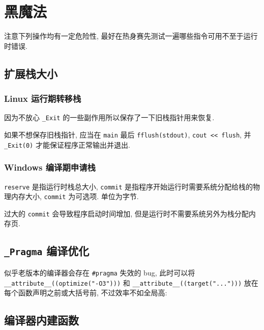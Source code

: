 \section{黑魔法}
注意下列操作均有一定危险性, 最好在热身赛先测试一遍哪些指令可用不至于运行时错误.

\subsection{扩展栈大小}
\subsubsection{Linux 运行期转移栈}


因为不放心 \lstinline{_Exit} 的一些副作用所以保存了一下旧栈指针用来恢复.

如果不想保存旧栈指针, 应当在 \lstinline{main} 最后 \lstinline{fflush(stdout)}, \lstinline{cout << flush}, 并 \lstinline{_Exit(0)} 才能保证程序正常输出并退出.

\subsubsection{Windows 编译期申请栈}


\lstinline{reserve} 是指运行时栈总大小, \lstinline{commit} 是指程序开始运行时需要系统分配给栈的物理内存大小, \lstinline{commit} 为可选项. 单位为字节.

过大的 \lstinline{commit} 会导致程序启动时间增加, 但是运行时不需要系统另外为栈分配内存页.

\subsection{\lstinline[basicstyle=\mono]{_Pragma} 编译优化}


似乎老版本的编译器会存在 \lstinline{#pragma} 失效的 bug, 此时可以将 \lstinline{__attribute__((optimize("-O3")))} 和 \lstinline{__attribute__((target("...")))} 放在每个函数声明之前或大括号前, 不过效率不如全局高:



\subsection{编译器内建函数}
